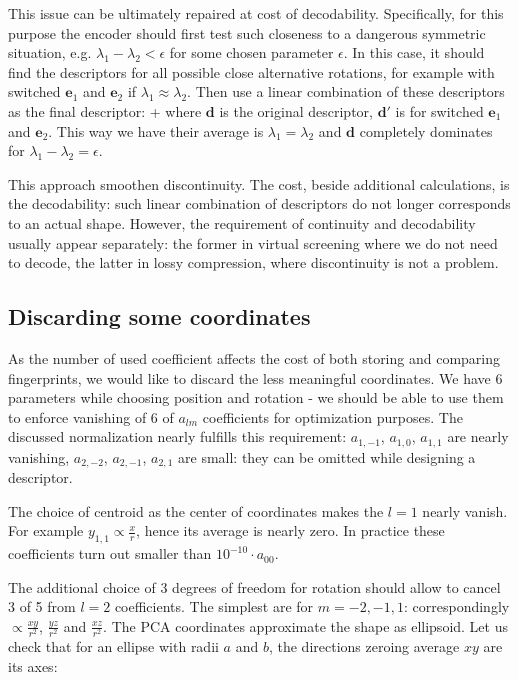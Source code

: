 \documentclass[10pt,journal]{IEEEtranTCOM}
\theoremstyle{plain}
\begin{document}
This issue can be ultimately repaired at cost of decodability. Specifically, for this purpose the encoder should first test such closeness to a dangerous symmetric situation, e.g. $\lambda_1-\lambda_2 < \epsilon$ for some chosen parameter $\epsilon$. In this case, it should find the descriptors for all possible close alternative rotations, for example with switched $\textbf{e}_1$ and $\textbf{e}_2$ if $\lambda_1 \approx \lambda_2$. Then use a linear combination of these descriptors as the final descriptor:
\be {}+  \ee
where $\textbf{d}$ is the original descriptor, $\textbf{d}'$ is for switched $\textbf{e}_1$ and $\textbf{e}_2$. This way we have their average is $\lambda_1=\lambda_2$ and $\textbf{d}$ completely dominates for $\lambda_1-\lambda_2=\epsilon$.

This approach smoothen discontinuity. The cost, beside additional calculations, is the decodability: such linear combination of descriptors do not longer corresponds to an actual shape. However, the requirement of continuity and decodability usually appear separately: the former in virtual screening where we do not need to decode, the latter in lossy compression, where discontinuity is not a problem.
\subsection{Discarding some coordinates}
As the number of used coefficient affects the cost of both storing and comparing fingerprints, we would like to discard the less meaningful coordinates. We have 6 parameters while choosing position and rotation - we should be able to use them to enforce vanishing of 6 of $a_{lm}$ coefficients for optimization purposes. The discussed normalization nearly fulfills this requirement:  $a_{1,-1}$, $a_{1,0}$, $a_{1,1}$ are nearly vanishing, $a_{2,-2}$, $a_{2,-1}$, $a_{2,1}$ are small: they can be omitted while designing a descriptor.

The choice of centroid as the center of coordinates makes the $l=1$ nearly vanish. For example $y_{1,1}\propto \frac{x}{r}$, hence its average is nearly zero. In practice these coefficients turn out smaller than $10^{-10}\cdot a_{00}$.

The additional choice of 3 degrees of freedom for rotation should allow to cancel 3 of 5 from $l=2$ coefficients. The simplest are for $m=-2,-1,1$: correspondingly $\propto \frac{xy}{r^2}$, $\frac{yz}{r^2}$ and $\frac{xz}{r^2}$. The PCA coordinates approximate the shape as ellipsoid. Let us check that for an ellipse with radii $a$ and $b$, the directions zeroing average $xy$ are its axes:
\end{document}
